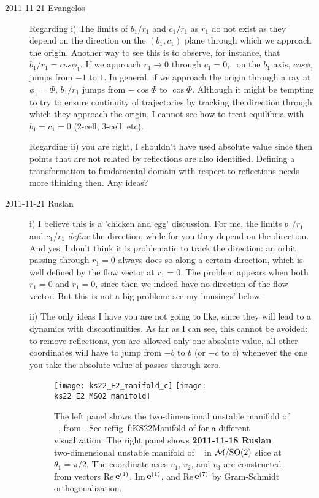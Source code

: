 \begin{description}
\item[2011-11-21 Evangelos] Regarding i) The limits of
  $b_1/r_1$ and $c_1/r_1$ as $r_1$ do not exist as they depend on the
  direction on the $(b_1,c_1)$ plane through which we approach the origin.
  Another way to see this is to observe, for instance, that $b_1/r_1 = cos \phi_1$.
  If we approach $r_1\rightarrow0$ through $c_1=0$, \ie\ on the $b_1$ axis,
  $cos \phi_1$ jumps from $-1$ to $1$. In general, if we approach the origin
  through a ray at $\phi_1=\Phi$, $b_1/r_1$ jumps from $-\cos \Phi$ to $\cos \Phi$.
  Although it might be tempting to try to ensure continuity of trajectories by
  tracking the direction through which they approach the origin, I cannot see how
  to treat equilibria with $b_1=c_1=0$ (2-cell, 3-cell, etc).

  Regarding ii) you are right, I shouldn't have used absolute value since then
  points that are not related by reflections are also identified. Defining
  a transformation to fundamental domain with respect to reflections
  needs more thinking then. Any ideas?

\item[2011-11-21 Ruslan] i) I believe this is a 'chicken and egg' discussion.  For me, the limits $b_1/r_1$ and $c_1/r_1$ {\em define} the direction, while for you they depend on the direction.  And yes, I don't think it is problematic to track the direction: an orbit passing through $r_1 = 0$ always does so along a certain direction, which is well defined by the flow vector at $r_1 = 0$.  The problem appears when both $r_1 = 0$ and $\dot{r}_1 = 0$, since then we indeed have no direction of the flow vector.  But this is not a big problem: see my 'musings' below.

    ii) The only ideas I have you are not going to like, since they will lead to a dynamics with discontinuities.  As far as I can see, this cannot be avoided: to remove reflections, you are allowed only one absolute value, all other coordinates will have to jump from $-b$ to $b$ (or $-c$ to $c$) whenever the one you take the absolute value of passes through zero.

\begin{figure}[ht]
\begin{center}
\texttt{[image: ks22\_E2\_manifold\_c]}
\texttt{[image: ks22\_E2\_MSO2\_manifold]}
\end{center}
\caption{
The left panel shows the two-dimensional unstable manifold of \eqv\
, from . See reffig~{f:KS22Manifold} of
\refref{SCD07} for a different visualization. The right panel shows {\bf
2011-11-18 Ruslan} two-dimensional unstable manifold of \eqv\ \EQV{2} in
$\pS/\SOn{2}$ slice at $\theta_1 = \pi/2$. The coordinate axes $v_1$,
$v_2$, and $v_3$ are constructed from vectors Re\,$\jEigvec[1]$,
Im\,$\jEigvec[1]$, and {Re\,}$\jEigvec[7]$ by Gram-Schmidt
orthogonalization.
       }
\label{f:KS22E2man1}
\end{figure}


\end{description}
